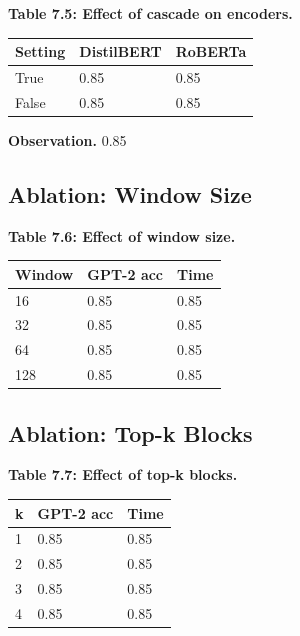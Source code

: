\textbf{Table 7.5: Effect of cascade on encoders.}

\begin{table}[H]
\centering
\small
\begin{tabular}{lll}
\toprule
\textbf{Setting} & \textbf{DistilBERT} & \textbf{RoBERTa} \\
\midrule
True & 0.85 & 0.85 \\
False & 0.85 & 0.85 \\
\bottomrule
\end{tabular}
\end{table}

\textbf{Observation.} 0.85

\subsection{Ablation: Window Size}

\textbf{Table 7.6: Effect of window size.}

\begin{table}[H]
\centering
\small
\begin{tabular}{lll}
\toprule
\textbf{Window} & \textbf{GPT-2 acc} & \textbf{Time} \\
\midrule
16 & 0.85 & 0.85 \\
32 & 0.85 & 0.85 \\
64 & 0.85 & 0.85 \\
128 & 0.85 & 0.85 \\
\bottomrule
\end{tabular}
\end{table}

\subsection{Ablation: Top-k Blocks}

\textbf{Table 7.7: Effect of top-k blocks.}

\begin{table}[H]
\centering
\small
\begin{tabular}{lll}
\toprule
\textbf{k} & \textbf{GPT-2 acc} & \textbf{Time} \\
\midrule
1 & 0.85 & 0.85 \\
2 & 0.85 & 0.85 \\
3 & 0.85 & 0.85 \\
4 & 0.85 & 0.85 \\
\bottomrule
\end{tabular}
\end{table}

